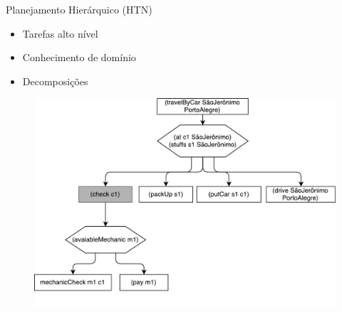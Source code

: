 \documentclass{beamer}
\begin{document}
\begin{frame}{Planejamento Hierárquico (HTN)}
	\begin{itemize}
		\item Tarefas alto nível
		\item Conhecimento de domínio
		\item Decomposições
	\end{itemize}
	\vspace{-3mm}
	\begin{figure}[here]
		\includegraphics[width=0.7\linewidth]{fig/htnmethodresult.pdf}	
	\end{figure}	
\end{frame}
\end{document}
